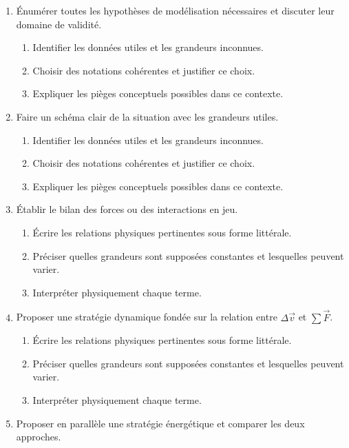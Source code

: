 \documentclass[11pt,a4paper]{article}
\begin{document}
\begin{enumerate}[label=\textbf{Très long \arabic*.},leftmargin=*]
\begin{enumerate}[label=\textbf{\arabic*)}]
\begin{enumerate}[label=\alph*)]
\item Expliquer les pièges conceptuels possibles dans ce contexte.
\end{enumerate}
\item Énumérer toutes les hypothèses de modélisation nécessaires et discuter leur domaine de validité.
\begin{enumerate}[label=\alph*)]
\item Identifier les données utiles et les grandeurs inconnues.
\item Choisir des notations cohérentes et justifier ce choix.
\item Expliquer les pièges conceptuels possibles dans ce contexte.
\end{enumerate}
\item Faire un schéma clair de la situation avec les grandeurs utiles.
\begin{enumerate}[label=\alph*)]
\item Identifier les données utiles et les grandeurs inconnues.
\item Choisir des notations cohérentes et justifier ce choix.
\item Expliquer les pièges conceptuels possibles dans ce contexte.
\end{enumerate}
\item Établir le bilan des forces ou des interactions en jeu.
\begin{enumerate}[label=\alph*)]
\item Écrire les relations physiques pertinentes sous forme littérale.
\item Préciser quelles grandeurs sont supposées constantes et lesquelles peuvent varier.
\item Interpréter physiquement chaque terme.
\end{enumerate}
\item Proposer une stratégie dynamique fondée sur la relation entre $\Delta\vec v$ et $\sum\vec F$.
\begin{enumerate}[label=\alph*)]
\item Écrire les relations physiques pertinentes sous forme littérale.
\item Préciser quelles grandeurs sont supposées constantes et lesquelles peuvent varier.
\item Interpréter physiquement chaque terme.
\end{enumerate}
\item Proposer en parallèle une stratégie énergétique et comparer les deux approches.
\begin{enumerate}[label=\alph*)]

\end{enumerate}
\end{enumerate}
\end{enumerate}
\end{document}
